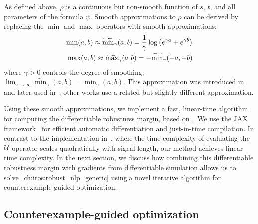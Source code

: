 As defined above, $\rho$ is a continuous but non-smooth function of $s$, $t$, and all parameters of the formula $\psi$. Smooth approximations to $\rho$ can be derived by replacing the $\min$ and $\max$ operators with smooth approximations:
\begin{align}
    \min(a, b) \approx \widetilde{\min}_\gamma(a, b) = \frac{1}{\gamma} \log\left( e^{\gamma a} + e^{\gamma b} \right) \label{ch:iros:smooth_min} \\
    \max(a, b) \approx \widetilde{\max}_\gamma(a, b) = -\widetilde{\min}_{\gamma}(-a, -b) \label{ch:iros:smooth_max}
\end{align}
where $\gamma > 0$ controls the degree of smoothing; $\lim_{\gamma \to \infty} \widetilde{\min}_\gamma(a, b) = \min_\gamma(a, b)$. This approximation was introduced in~\cite{pantSmoothOperatorControl2017} and later used in~\cite{pantFlybyLogicControlMultiDrone2018,pantazidesSatelliteMissionPlanning2022}; other works \cite{leungBackPropagationSignalTemporal2021} use a related but slightly different approximation.

Using these smooth approximations, we implement a fast, linear-time algorithm for computing the differentiable robustness margin, based on~\cite{donzeEfficientRobustMonitoring2013a}. We use the JAX framework~\cite{jax2018github} for efficient automatic differentiation and just-in-time compilation. In contrast to the implementation in~\cite{leungBackPropagationSignalTemporal2021}, where the time complexity of evaluating the $\mathcal{U}$ operator scales quadratically with signal length, our method achieves linear time complexity. In the next section, we discuss how combining this differentiable robustness margin with gradients from differentiable simulation allows us to solve~\eqref{ch:iros:robust_nlp_generic} using a novel iterative algorithm for counterexample-guided optimization.

\subsection{Counterexample-guided optimization}\label{ch:iros:cego}


